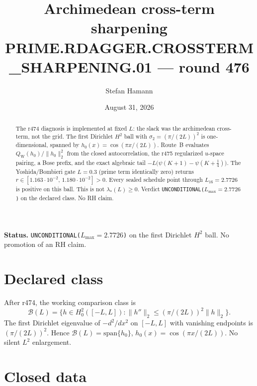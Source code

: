 \documentclass[11pt]{article}
\title{\bfseries Archimedean cross-term sharpening\\[2mm]
\large PRIME.RDAGGER.CROSSTERM\_SHARPENING.01 --- round 476}
\author{Stefan Hamann}
\date{August 31, 2026}
\theoremstyle{remark}
\newcommand{\QW}{Q_{\mathrm W}}
\begin{document}
\maketitle

\begin{abstract}\noindent
The r474 diagnosis is implemented at fixed $L$: the slack was the
archimedean cross-term, not the grid.  The first Dirichlet $H^2$
ball with $\sigma_2=(\pi/(2L))^2$ is one-dimensional, spanned by
$h_0(x)=\cos(\pi x/(2L))$.  Route~B evaluates $\QW(h_0)/\|h_0\|_2^2$
from the closed autocorrelation, the r475 regularized $u$-space
pairing, a Bose prefix, and the exact algebraic tail
$-L\bigl(\psi(K+1)-\psi(K+\tfrac14)\bigr)$.  The Yoshida/Bombieri
gate $L=0.3$ (prime term identically zero) returns
$r\in[1.163\cdot10^{-2},\,1.180\cdot10^{-2}]>0$.  Every sealed
schedule point through $L_{16}=2.7726$ is positive on this ball.
This is not $\lambda_*(L)\ge0$.  Verdict
\texttt{UNCONDITIONAL($L_{\max}=2.7726$)} on the declared class.
No RH claim.
\end{abstract}

\medskip\noindent
\textbf{Status.}\enspace
\texttt{UNCONDITIONAL($L_{\max}=2.7726$)} on the first Dirichlet
$H^2$ ball.  No promotion of an RH claim.

\begin{center}
\end{center}

\section{Declared class}

After r474, the working comparison class is
\[
 \mathcal B(L)=\bigl\{h\in H^2_0([-L,L]):
 \|h''\|_2\le(\pi/(2L))^2\|h\|_2\bigr\}.
\]
The first Dirichlet eigenvalue of $-d^2/dx^2$ on $[-L,L]$ with
vanishing endpoints is $(\pi/(2L))^2$.  Hence
$\mathcal B(L)=\mathrm{span}\{h_0\}$,
$h_0(x)=\cos(\pi x/(2L))$.  No silent $L^2$ enlargement.

\section{Closed data}
\end{document}
